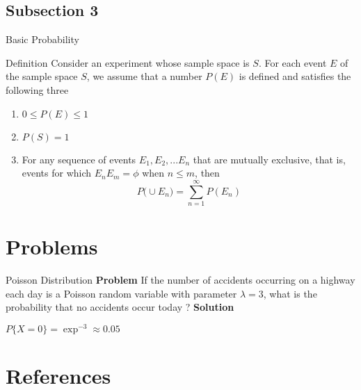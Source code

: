 \documentclass[11pt]{beamer}
\begin{document}
\subsection{Subsection 3}
\begin{frame}{Basic Probability}
\begin{block}{Definition \cite{ross}}
\justifying
Consider an experiment whose sample space is $S$. For each event $E$ of the sample space $S$, we assume that a number $P(E)$ is defined and satisfies the following three
\begin{enumerate}[<+->]
    \item $0 \leq P(E) \leq 1$
    \item $P(S) = 1$
    \item For any sequence of events $E_{1} , E_{2} , . . .E_{n}$ that are mutually exclusive, that is, events for which $E_{n}E_{m} = \phi$ when $n \leq m$, then
    \begin{equation}
        P\Big(\cup E_{n}\Big) = \sum_{n=1}^{\infty}P(E_{n})
    \end{equation}
\end{enumerate}
\end{block}
\end{frame}





\section{Problems}
\begin{frame}{Poisson Distribution}
\textbf{Problem} \newline
If the number of accidents occurring on a highway each day is a Poisson random variable with parameter $\lambda = 3$, what is the probability that no accidents occur today ? \newline \vspace{5mm}
\textbf{Solution} \newline
\begin{center}
    $P\{X = 0\} = \exp^{−3} \approx 0.05$
\end{center}
\end{frame}

\section{References}

\nocite{*}

\end{document}
